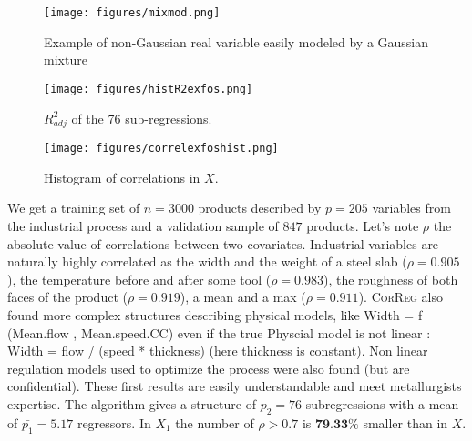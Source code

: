 \documentclass[11pt,a4paper]{article}
\begin{document}
\begin{figure}[h!]
	\begin{minipage}[l]{.30\linewidth}
			\texttt{[image: figures/mixmod.png]} 
			\caption{Example of non-Gaussian real variable easily modeled by a Gaussian mixture}\label{graphMixmod}
	\end{minipage} \hfill
	\begin{minipage}[c]{.30\linewidth}
			\texttt{[image: figures/histR2exfos.png]} 
			\caption{$R^2_{adj}$ of the 76 sub-regressions.}
	\end{minipage} \hfill
   \begin{minipage}[r]{.30\linewidth}
			\texttt{[image: figures/correlexfoshist.png]} 
			\caption{Histogram of correlations in $X$.} \label{compareMSEexfos}
   \end{minipage}
\end{figure}   			
	We get a training set of $n=3 000$ products described by $p=205$ variables from the industrial process and a validation sample of $847$ products.
	Let's note $\rho$ the absolute value of correlations between two covariates. Industrial variables are naturally highly correlated as the width and the weight of a steel slab ($\rho=0.905$), the temperature before and after some tool ($\rho=0.983$), the  roughness of both faces of the product ($\rho= 0.919$), a mean and a max ($\rho=0.911$). \textsc{CorReg} also found more complex structures describing physical models, like   Width = f (Mean.flow , Mean.speed.CC) even if the true Physcial model is not linear : Width = flow / (speed * thickness) (here thickness is constant). Non linear regulation models used to optimize the process were also found (but are confidential). These first results are easily understandable and meet metallurgists expertise.  
			The algorithm gives a structure of $p_2=76$ subregressions with a mean of $\bar{p_1}=5.17$ regressors. In $X_1$ the number of $\rho>0.7$ is $\textbf{79.33\%}$ smaller than in $X$.		
	
\end{document}
